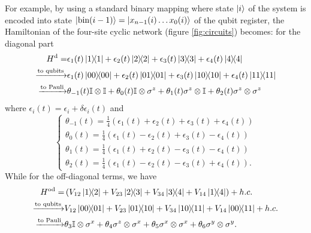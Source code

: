 \documentclass[12pt, amsmath, amssymb, graphicx]{iopart}
\begin{document}
For example, by using a standard binary mapping where state $\ket{i}$ of the system is encoded into state $\ket{\text{bin}(i-1)} = \ket{x_{n-1}(i) \dots x_{0}(i)}$ of the qubit register, the Hamiltonian of the four-site cyclic network (figure \ref{fig:circuits}) becomes: for the diagonal part
%
\begin{equation}
\begin{split}
    H^\text{d} =& \epsilon_1(t) \ketbra{1} + \epsilon_2(t) \ketbra{2} + \epsilon_3(t) \ketbra{3} + \epsilon_4(t) \ketbra{4}\\
    \xrightarrow{\text{to qubits}}&
    \epsilon_1(t) \ketbra{00} + \epsilon_2(t) \ketbra{01} + \epsilon_3(t) \ketbra{10} + \epsilon_4(t) \ketbra{11}\\
    \xrightarrow{\text{to Pauli}}&
    \theta_{-1}(t) \mathbb{I} \otimes \mathbb{I} +
    \theta_{0}(t) \mathbb{I} \otimes \sigma^z +
    \theta_{1}(t) \sigma^z \otimes \mathbb{I} +
    \theta_{2}(t) \sigma^z \otimes \sigma^z
\end{split}
\end{equation}
%
where $\epsilon_i(t) = \epsilon_i + \delta\epsilon_i(t)$ and
\begin{equation}
    \begin{cases}
        \theta_{-1}(t) = \frac{1}{4} \left( \epsilon_1(t) + \epsilon_2(t) + \epsilon_3(t) + \epsilon_4(t) \right)\\
        \theta_{0}(t) = \frac{1}{4} \left( \epsilon_1(t) - \epsilon_2(t) + \epsilon_3(t) - \epsilon_4(t) \right)\\
        \theta_{1}(t) = \frac{1}{4} \left( \epsilon_1(t) + \epsilon_2(t) - \epsilon_3(t) - \epsilon_4(t) \right)\\
        \theta_{2}(t) = \frac{1}{4} \left( \epsilon_1(t) - \epsilon_2(t) - \epsilon_3(t) + \epsilon_4(t) \right).
    \end{cases}
\end{equation}
While for the off-diagonal terms, we have
%
\begin{equation}
\begin{split}
    H^\text{od} =& \left( V_{12} \ketbra{1}{2} + V_{23} \ketbra{2}{3} + V_{34}\ketbra{3}{4}+ V_{14} \ketbra{1}{4} \right) + h.c.\\
    \xrightarrow{\text{to qubits}}&
    V_{12} \ketbra{00}{01} + V_{23} \ketbra{01}{10} + V_{34} \ketbra{10}{11} + V_{14} \ketbra{00}{11} + h.c.\\
    \xrightarrow{\text{to Pauli}}&
    \theta_{3} \mathbb{I} \otimes \sigma^x +
    \theta_{4} \sigma^z \otimes \sigma^x +
    \theta_{5} \sigma^x \otimes \sigma^x +
    \theta_{6} \sigma^y \otimes \sigma^y.
\end{split}
\end{equation}
\end{document}
